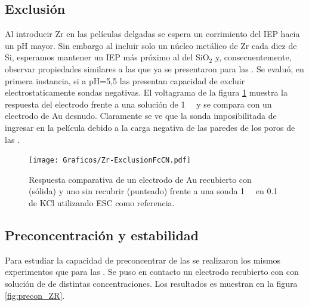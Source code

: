 	 \subsection{Exclusión}

	 	 Al introducir Zr en las películas delgadas se espera un corrimiento del IEP hacia un pH mayor\cite{Kosmulski2014}. Sin embargo al incluir solo un núcleo metálico de Zr cada diez de Si, esperamos mantener un IEP más próximo al del SiO$_2$ y, consecuentemente, observar propiedades similares a las que ya se presentaron para las \pdmF.
	 	 Se evaluó, en primera instancia, si a pH=5,5 las \pdmZ\space presentan capacidad de excluir electrostaticamente sondas negativas. El voltagrama de la figura \ref{fig:fcn-zr} muestra la respuesta del electrodo frente a una solución de \fe\space \SI{1}{\milli\Molar} y se compara con un electrodo de Au desnudo. Claramente se ve que la sonda imposibilitada de ingresar en la película debido a la carga negativa de las paredes de los poros de las \pdmZ. 
				
				\begin{figure}[ht]
				\centering
		 	    \texttt{[image: Graficos/Zr-ExclusionFcCN.pdf]}
		        \caption[Exclusión electrostática en \pdmZ]{Respuesta comparativa de un electrodo de Au recubierto con \pdmZ\space (sólida) y uno sin recubrir (punteado) frente a una sonda \ferroferri\space \SI{1}{\milli\Molar} en \SI{0.1}{\Molar} de KCl utilizando ESC como referencia.}
		        \label{fig:fcn-zr}
		      	\end{figure} 
	
	 \subsection{Preconcentración y estabilidad}\label{sub:pcirc}

		 	Para estudiar la capacidad de preconcentrar de las \pdmZ\space se realizaron los mismos experimentos que para las \pdmF. Se puso en contacto un electrodo recubierto con \pdmZ\space con solución de \ru\space de distintas concentraciones. Los resultados es muestran en la figura \ref{fig:precon_ZR}.

